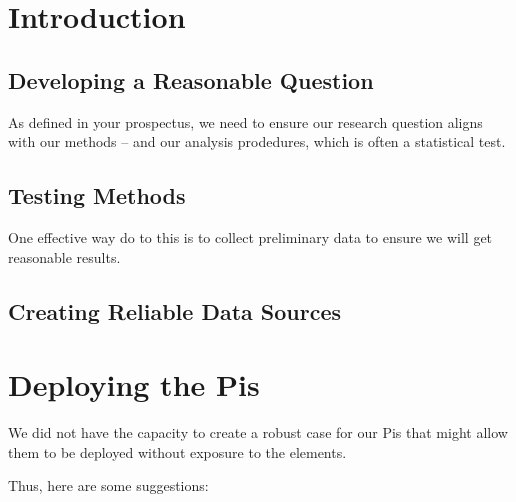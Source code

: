 \documentclass{article}\usepackage[]{graphicx}\usepackage[]{color}
\begin{document}
\section{Introduction}

\subsection{Developing a Reasonable Question}

As defined in your prospectus, we need to ensure our research question aligns with our methods -- and our analysis prodedures, which is often a statistical test. 

\subsection{Testing Methods}

One effective way do to this is to collect preliminary data to ensure we will get reasonable results. 

\subsection{Creating Reliable Data Sources}

\section{Deploying the Pis}

We did not have the capacity to create a robust case for our Pis that might allow them to be deployed without exposure to the elements. 

Thus, here are some suggestions:
\end{document}
